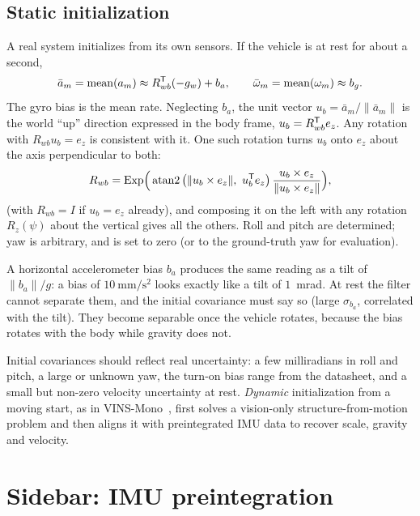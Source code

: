\subsection{Static initialization}

A real system initializes from its own sensors. If the vehicle is at rest for about a second,
\begin{equation}
  \bar a_m = \mathrm{mean}(a_m) \approx R_{wb}^{\mathsf{T}}(-g_w) + b_a, \qquad \bar\omega_m = \mathrm{mean}(\omega_m) \approx b_g .
\end{equation}
The gyro bias is the mean rate. Neglecting $b_a$, the unit vector $u_b = \bar a_m/\|\bar a_m\|$ is the world
``up'' direction expressed in the body frame, $u_b = R_{wb}^{\mathsf{T}} e_z$. Any rotation with $R_{wb}u_b = e_z$ is consistent
with it. One such rotation turns $u_b$ onto $e_z$ about the axis perpendicular to both:
\begin{equation}
  R_{wb} = \operatorname{Exp}\!\Big(\operatorname{atan2}\big(\|u_b\times e_z\|,\ u_b^{\mathsf{T}} e_z\big)\,\frac{u_b\times e_z}{\|u_b\times e_z\|}\Big),
\end{equation}
(with $R_{wb} = I$ if $u_b = e_z$ already), and composing it on the left with any rotation $R_z(\psi)$ about the vertical gives all the others. Roll and pitch are
determined; yaw is arbitrary, and is set to zero (or to the ground-truth yaw for evaluation).

\begin{pitfall}
A horizontal accelerometer bias $b_a$ produces the same reading as a tilt of $\|b_a\|/g$: a bias of
$10~\mathrm{mm/s^2}$ looks exactly like a tilt of $1$~mrad. At rest the filter cannot separate them, and the initial
covariance must say so (large $\sigma_{b_a}$, correlated with the tilt). They become separable once the vehicle
rotates, because the bias rotates with the body while gravity does not.
\end{pitfall}

Initial covariances should reflect real uncertainty: a few milliradians in roll and pitch, a large or
unknown yaw, the turn-on bias range from the datasheet, and a small but non-zero velocity uncertainty at rest.
\emph{Dynamic} initialization from a moving start, as in VINS-Mono~\cite{qin2018vins}, first solves a
vision-only structure-from-motion problem and then aligns it with preintegrated IMU data to recover scale,
gravity and velocity.

\section{Sidebar: IMU preintegration}

